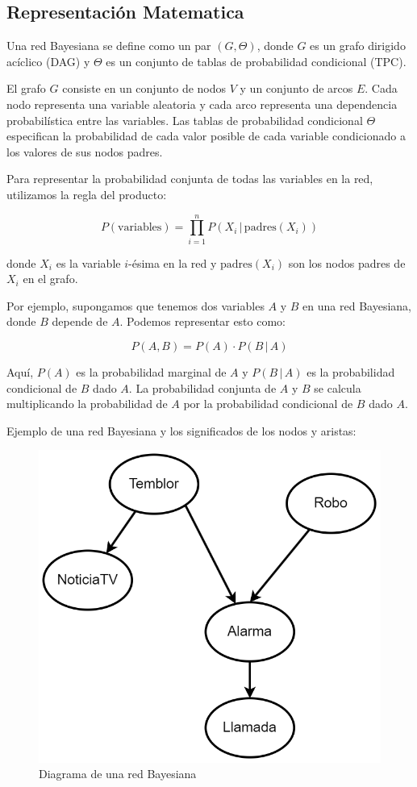 \begin{enumerate}
\subsection*{Representación Matematica}
Una red Bayesiana se define como un par \( (G, \Theta) \), donde \( G \) es un grafo dirigido acíclico (DAG) y \( \Theta \) es un conjunto de tablas de probabilidad condicional (TPC). 

El grafo \( G \) consiste en un conjunto de nodos \( V \) y un conjunto de arcos \( E \). Cada nodo representa una variable aleatoria y cada arco representa una dependencia probabilística entre las variables. Las tablas de probabilidad condicional \( \Theta \) especifican la probabilidad de cada valor posible de cada variable condicionado a los valores de sus nodos padres.

Para representar la probabilidad conjunta de todas las variables en la red, utilizamos la regla del producto:

\[
P(\text{{variables}}) = \prod_{i=1}^{n} P(X_i \,|\, \text{{padres}}(X_i))
\]

donde \( X_i \) es la variable \( i \)-ésima en la red y \( \text{{padres}}(X_i) \) son los nodos padres de \( X_i \) en el grafo.

Por ejemplo, supongamos que tenemos dos variables \( A \) y \( B \) en una red Bayesiana, donde \( B \) depende de \( A \). Podemos representar esto como:

\[
P(A, B) = P(A) \cdot P(B \,|\, A)
\]

Aquí, \( P(A) \) es la probabilidad marginal de \( A \) y \( P(B \,|\, A) \) es la probabilidad condicional de \( B \) dado \( A \). La probabilidad conjunta de \( A \) y \( B \) se calcula multiplicando la probabilidad de \( A \) por la probabilidad condicional de \( B \) dado \( A \).

Ejemplo de una red Bayesiana y los significados de los nodos y aristas:

\begin{figure}[H]
    \centering
    \includegraphics[width=0.35\linewidth]{IMA/RedesBayes.png} 
    \caption{Diagrama de una red Bayesiana} 
\end{figure}


\end{enumerate}
